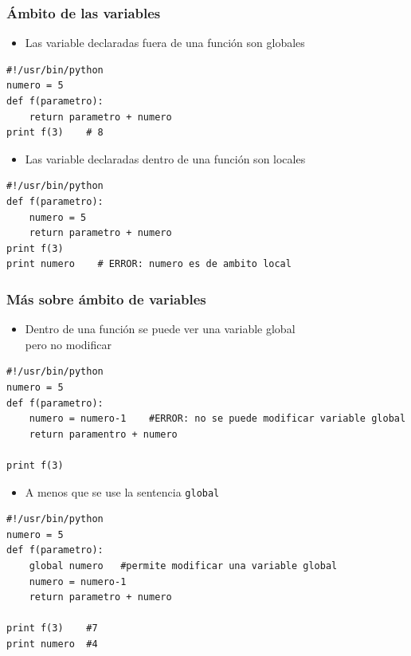 \documentclass{beamer}
\begin{document}
\begin{frame}[fragile]
\frametitle{Ámbito de las variables}
\begin{itemize}
\item 
Las variable declaradas fuera de una función son globales
\end{itemize}
  \begin{footnotesize}
\begin{verbatim}
#!/usr/bin/python
numero = 5
def f(parametro):
    return parametro + numero
print f(3)    # 8
\end{verbatim}
  \end{footnotesize}

\begin{itemize}
\item 
Las variable declaradas dentro de una función son locales
\end{itemize}

  \begin{footnotesize}
\begin{verbatim}
#!/usr/bin/python
def f(parametro):
    numero = 5
    return parametro + numero
print f(3)
print numero    # ERROR: numero es de ambito local
\end{verbatim}
  \end{footnotesize}


\end{frame}


\begin{frame}[fragile]
\frametitle{Más sobre ámbito de variables}

\begin{itemize}
\item 
Dentro de una función se puede ver una variable global\\
pero no modificar
\end{itemize}
  \begin{footnotesize}
\begin{verbatim}
#!/usr/bin/python
numero = 5
def f(parametro):
    numero = numero-1    #ERROR: no se puede modificar variable global
    return paramentro + numero
    
print f(3)
\end{verbatim}
  \end{footnotesize}

\begin{itemize}
\item 
A menos que se use la sentencia \verb|global|
\end{itemize}



  \begin{footnotesize}
\begin{verbatim}
#!/usr/bin/python
numero = 5
def f(parametro):
    global numero   #permite modificar una variable global
    numero = numero-1   
    return parametro + numero
    
print f(3)    #7
print numero  #4
\end{verbatim}
  \end{footnotesize}


\end{frame}
\end{document}
